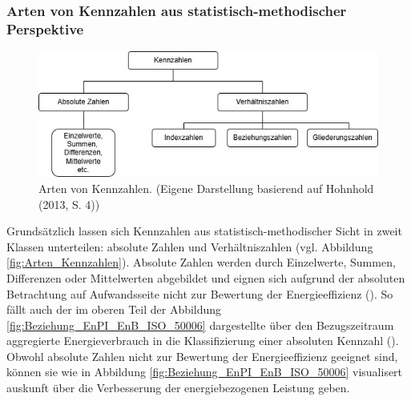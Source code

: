 \subsubsection{Arten von Kennzahlen aus statistisch-methodischer Perspektive}

\begin{figure}[H]
    \centering
    \includegraphics[width=1\textwidth]{../../Ressourcen/Abbildungen/Arten_von_Kennzahlen.jpg}
    \caption{Arten von Kennzahlen. (Eigene Darstellung basierend auf Hohnhold (2013, S. 4))}
    \label{fig:Arten_Kennzahlen}
\end{figure}

Grundsätzlich lassen sich Kennzahlen aus statistisch-methodischer Sicht in zweit Klassen unterteilen: absolute Zahlen und Verhältniszahlen (vgl. Abbildung \eqref{fig:Arten_Kennzahlen}).
Absolute Zahlen werden durch Einzelwerte, Summen, Differenzen oder Mittelwerten abgebildet und eignen sich aufgrund der absoluten Betrachtung auf Aufwandsseite nicht zur Bewertung der Energieeffizienz (\cite[S. 2]{Hohnhold.2013}).
So fällt auch der im oberen Teil der Abbildung \eqref{fig:Beziehung_EnPI_EnB_ISO_50006} dargestellte über den Bezugszeitraum aggregierte Energieverbrauch 
in die Klassifizierung einer absoluten Kennzahl (\cite[S. 2]{Hohnhold.2013}).
Obwohl absolute Zahlen nicht zur Bewertung der Energieeffizienz geeignet sind, können sie wie in Abbildung \eqref{fig:Beziehung_EnPI_EnB_ISO_50006} visualisert 
auskunft über die Verbesserung der energiebezogenen Leistung geben.

